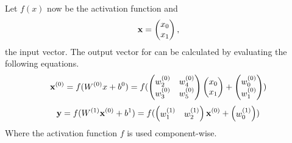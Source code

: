 Let \(f(x)\) now be the activation function and
\begin{equation}
    \textbf{x} =
    \begin{pmatrix}
        x_0 \\
        x_1
    \end{pmatrix},
\end{equation}
the input vector.
The output vector for  can be calculated by evaluating the following equations.
\begin{equation}
    \textbf{x}^{(0)} =
    f(W^{(0)}x + b^{0}) =
    f(
    \begin{pmatrix}
        w_{2}^{(0)} & w_{4}^{(0)} \\
        w_{3}^{(0)} & w_{5}^{(0)}
    \end{pmatrix}
    \begin{pmatrix}
        x_0 \\
        x_1
    \end{pmatrix}
    +
    \begin{pmatrix}
        w_{0}^{(0)} \\
        w_{1}^{(0)}
    \end{pmatrix}
    )
\end{equation}
\begin{equation}
    \textbf{y} =
    f(W^{(1)}\textbf{x}^{(0)}+ b^{1}) =
    f(
    \begin{pmatrix}
        w_{1}^{(1)} & w_{2}^{(1)}
    \end{pmatrix}
    \textbf{x}^{(0)}
    +
    \begin{pmatrix}
        w_{0}^{(1)}
    \end{pmatrix}
    )
\end{equation}
Where the activation function \(f\) is used component-wise.